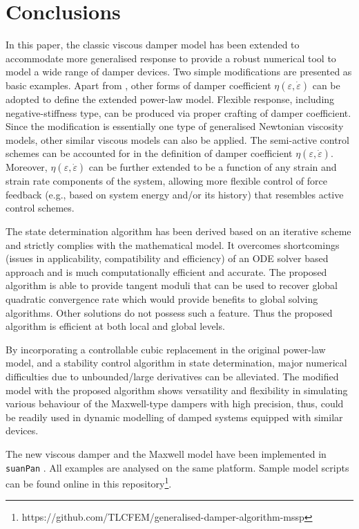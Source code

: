 \section{Conclusions}
In this paper, the classic viscous damper model has been extended to accommodate more generalised response to provide a robust numerical tool to model a wide range of damper devices. Two simple modifications are presented as basic examples. Apart from , other forms of damper coefficient $\eta\left(\varepsilon,\dot{\varepsilon}\right)$ can be adopted to define the extended power-law model. Flexible response, including negative-stiffness type, can be produced via proper crafting of damper coefficient. Since the modification is essentially one type of generalised Newtonian viscosity models, other similar viscous models can also be applied. The semi-active control schemes can be accounted for in the definition of damper coefficient $\eta\left(\varepsilon,\dot{\varepsilon}\right)$. Moreover, $\eta\left(\varepsilon,\dot{\varepsilon}\right)$ can be further extended to be a function of any strain and strain rate components of the system, allowing more flexible control of force feedback (e.g., based on system energy and/or its history) that resembles active control schemes.

The state determination algorithm has been derived based on an iterative scheme and strictly complies with the mathematical model. It overcomes shortcomings (issues in applicability, compatibility and efficiency) of an ODE solver based approach and is much computationally efficient and accurate. The proposed algorithm is able to provide tangent moduli that can be used to recover global quadratic convergence rate which would provide benefits to global solving algorithms. Other solutions do not possess such a feature. Thus the proposed algorithm is efficient at both local and global levels.

By incorporating a controllable cubic replacement in the original power-law model, and a stability control algorithm in state determination, major numerical difficulties due to unbounded/large derivatives can be alleviated. The modified model with the proposed algorithm shows versatility and flexibility in simulating various behaviour of the Maxwell-type dampers with high precision, thus, could be readily used in dynamic modelling of damped systems equipped with similar devices.

The new viscous damper and the Maxwell model have been implemented in \texttt{suanPan} \citep{Chang2018}. All examples are analysed on the same platform. Sample model scripts can be found online in this repository\footnote{https://github.com/TLCFEM/generalised-damper-algorithm-mssp}.
